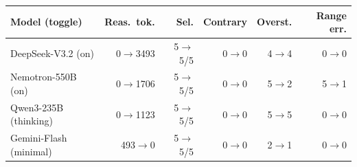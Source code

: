 \begin{tabular}{@{}lrrrrr@{}}
\toprule
Model (toggle) & Reas.\ tok. & Sel. & Contrary & Overst. & Range err. \\
\midrule
DeepSeek-V3.2 (on) & 0$\to$3493 & 5$\to$5/5 & 0$\to$0 & 4$\to$4 & 0$\to$0 \\
Nemotron-550B (on) & 0$\to$1706 & 5$\to$5/5 & 0$\to$0 & 5$\to$2 & 5$\to$1 \\
Qwen3-235B (thinking) & 0$\to$1123 & 5$\to$5/5 & 0$\to$0 & 5$\to$5 & 0$\to$0 \\
Gemini-Flash (minimal) & 493$\to$0 & 5$\to$5/5 & 0$\to$0 & 2$\to$1 & 0$\to$0 \\
\bottomrule
\end{tabular}
